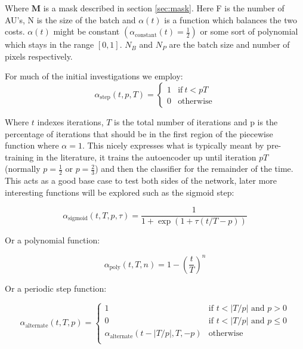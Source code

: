     Where $\mathbf{M}$ is a mask described in section \ref{sec:mask}. Here F is the number of AU's, N is the size of the batch and $\alpha(t)$ is a
    function which balances the two costs. $\alpha(t)$ might be constant $\left ( \alpha_{\text{constant}}(t)=\frac{1}{2} \right )$ or
    some sort of polynomial which stays in the range $[0,1]$. $N_B$ and $N_P$ are the batch size and number of pixels respectively.

    For much of the initial investigations we employ:
    \begin{equation}
      \alpha_{\text{step}}(t,p,T) =
      \begin{cases}
        1           & \text{if}\ t<pT \\
        0           & \text{otherwise}
      \end{cases}
    \end{equation}

    Where $t$ indexes iterations, $T$ is the total number of iterations and p is the
    percentage of iterations that should be in the first region of the piecewise function
    where $\alpha=1$.
    This nicely expresses what is typically meant by pre-training in the literature, it trains
    the autoencoder up until iteration $pT$ (normally $p=\frac{1}{2}$ or $p=\frac{2}{3}$) and then the classifier for the remainder of the time.
    This acts as a good base case to test both sides of the network, later more interesting
    functions will be explored such as the sigmoid step:

    \begin{equation}
      \alpha_{\text{sigmoid}}(t,T,p,\tau) = \frac{1}{1 + \exp(1 + \tau (t/T - p))}
    \end{equation}

    Or a polynomial function:

    \begin{equation}
      \alpha_{\text{poly}}(t,T,n) = 1 - \left ( \frac{t}{T} \right )^n
    \end{equation}

    Or a periodic step function:

    \begin{equation}
      \alpha_{\text{alternate}}(t,T,p) =
      \begin{cases}
        1           & \text{if } t < |T/p| \text{ and } p > 0\\
        0           & \text{if } t < |T/p| \text{ and } p \leq 0\\
        \alpha_{\text{alternate}}(t-|T/p|,T,-p)           & \text{otherwise} \\
      \end{cases}
    \end{equation}

